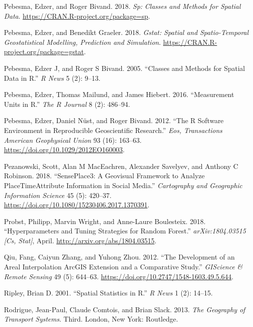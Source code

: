 \documentclass[]{krantz}
\begin{document}
\leavevmode\hypertarget{ref-R-sp}{}%
Pebesma, Edzer, and Roger Bivand. 2018. \emph{Sp: Classes and Methods for Spatial Data}. \url{https://CRAN.R-project.org/package=sp}.

\leavevmode\hypertarget{ref-R-gstat}{}%
Pebesma, Edzer, and Benedikt Graeler. 2018. \emph{Gstat: Spatial and Spatio-Temporal Geostatistical Modelling, Prediction and Simulation}. \url{https://CRAN.R-project.org/package=gstat}.

\leavevmode\hypertarget{ref-pebesma_classes_2005}{}%
Pebesma, Edzer J, and Roger S Bivand. 2005. ``Classes and Methods for Spatial Data in R.'' \emph{R News} 5 (2): 9--13.

\leavevmode\hypertarget{ref-pebesma_measurement_2016}{}%
Pebesma, Edzer, Thomas Mailund, and James Hiebert. 2016. ``Measurement Units in R.'' \emph{The R Journal} 8 (2): 486--94.

\leavevmode\hypertarget{ref-pebesma_r_2012}{}%
Pebesma, Edzer, Daniel Nüst, and Roger Bivand. 2012. ``The R Software Environment in Reproducible Geoscientific Research.'' \emph{Eos, Transactions American Geophysical Union} 93 (16): 163--63. \url{https://doi.org/10.1029/2012EO160003}.

\leavevmode\hypertarget{ref-pezanowski_senseplace3_2018}{}%
Pezanowski, Scott, Alan M MacEachren, Alexander Savelyev, and Anthony C Robinson. 2018. ``SensePlace3: A Geovisual Framework to Analyze PlaceTimeAttribute Information in Social Media.'' \emph{Cartography and Geographic Information Science} 45 (5): 420--37. \url{https://doi.org/10.1080/15230406.2017.1370391}.

\leavevmode\hypertarget{ref-probst_hyperparameters_2018}{}%
Probst, Philipp, Marvin Wright, and Anne-Laure Boulesteix. 2018. ``Hyperparameters and Tuning Strategies for Random Forest.'' \emph{arXiv:1804.03515 {[}Cs, Stat{]}}, April. \url{http://arxiv.org/abs/1804.03515}.

\leavevmode\hypertarget{ref-qiu_development_2012}{}%
Qiu, Fang, Caiyun Zhang, and Yuhong Zhou. 2012. ``The Development of an Areal Interpolation ArcGIS Extension and a Comparative Study.'' \emph{GIScience \& Remote Sensing} 49 (5): 644--63. \url{https://doi.org/10.2747/1548-1603.49.5.644}.

\leavevmode\hypertarget{ref-ripley_spatial_2001}{}%
Ripley, Brian D. 2001. ``Spatial Statistics in R.'' \emph{R News} 1 (2): 14--15.

\leavevmode\hypertarget{ref-rodrigue_geography_2013}{}%
Rodrigue, Jean-Paul, Claude Comtois, and Brian Slack. 2013. \emph{The Geography of Transport Systems}. Third. London, New York: Routledge.
\end{document}
